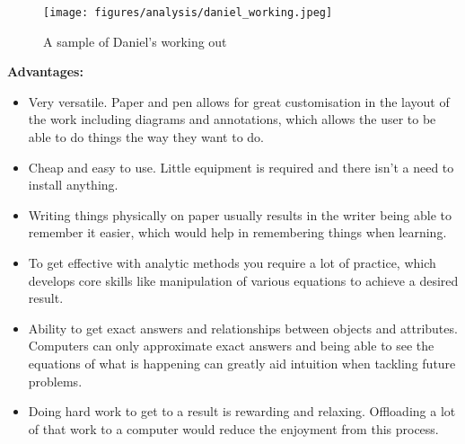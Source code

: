 \documentclass[11pt]{article}
\begin{document}
                \begin{figure}[!ht]
                    \centering
                    \texttt{[image: figures/analysis/daniel\_working.jpeg]}
                    \caption{A sample of Daniel's working out}
                    \label{fig:daniel_working}
                \end{figure}

                \pagebreak

                \textbf{Advantages:}
                \begin{itemize}
                    \item Very versatile. Paper and pen allows for great customisation in the layout of the work including diagrams and annotations, which allows the user to be able to do things the way they want to do.
                    \item Cheap and easy to use. Little equipment is required and there isn't a need to install anything. 
                    \item Writing things physically on paper usually results in the writer being able to remember it easier, which would help in remembering things when learning. 
                    \item To get effective with analytic methods you require a lot of practice, which develops core skills like manipulation of various equations to achieve a desired result.
                    \item Ability to get exact answers and relationships between objects and attributes. Computers can only approximate exact answers and being able to see the equations of what is happening can greatly aid intuition when tackling future problems.
                    \item Doing hard work to get to a result is rewarding and relaxing. Offloading a lot of that work to a computer would reduce the enjoyment from this process.
                \end{itemize}
\end{document}
